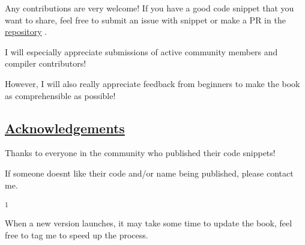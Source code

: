 Any contributions are very welcome! If you have a good code snippet that
you want to share, feel free to submit an issue with snippet or make a
PR in the
\href{https://github.com/sitandr/typst-examples-book}{repository} .

I will especially appreciate submissions of active community members and
compiler contributors!

However, I will also really appreciate feedback from beginners to make
the book as comprehensible as possible!

\subsection{\texorpdfstring{\hyperref[acknowledgements]{Acknowledgements}}{Acknowledgements}}\label{acknowledgements}

Thanks to everyone in the community who published their code snippets!

If someone doesn\textquotesingle t like their code and/or name being
published, please contact me.

\label{1}
\textsuperscript{1}

When a new version launches, it may take some time to update the book,
feel free to tag me to speed up the process.








